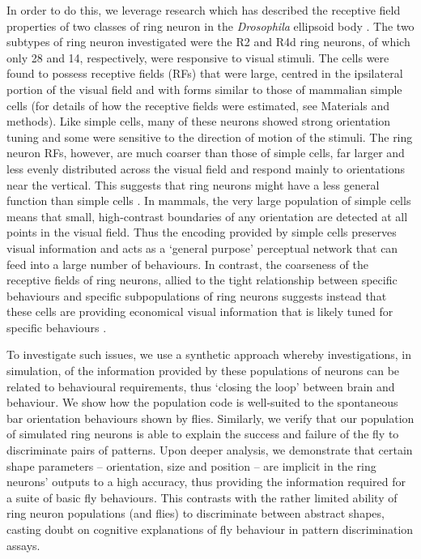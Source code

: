 In order to do this, we leverage research which has described the receptive field properties of two classes of ring neuron in the \emph{Drosophila} ellipsoid body \cite{Seelig2013}. The two subtypes of ring neuron investigated were the R2 and R4d ring neurons, of which only 28 and 14, respectively, were responsive to visual stimuli. The cells were found to possess receptive fields (\acp{RF}) that were large, centred in the ipsilateral portion of the visual field and with forms similar to those of mammalian simple cells \cite{Hubel1962} (for details of how the receptive fields were estimated, see Materials and methods). Like simple cells, many of these neurons showed strong orientation tuning and some were sensitive to the direction of motion of the stimuli. The ring neuron \acp{RF}, however, are much coarser than those of simple cells, far larger and less evenly distributed across the visual field and respond mainly to orientations near the vertical. This suggests that ring neurons might have a less general function than simple cells \cite{Wystrach2014}. In mammals, the very large population of simple cells means that small, high-contrast boundaries of any orientation are detected at all points in the visual field. Thus the encoding provided by simple cells preserves visual information and acts as a `general purpose' perceptual network that can feed into a large number of behaviours. In contrast, the coarseness of the receptive fields of ring neurons, allied to the tight relationship between specific behaviours and specific subpopulations of ring neurons suggests instead that these cells are providing economical visual information that is likely tuned for specific behaviours \cite{Wystrach2014}.

To investigate such issues, we use a synthetic approach whereby investigations, in simulation, of the information provided by these populations of neurons can be related to behavioural requirements, thus `closing the loop' between brain and behaviour. We show how the population code is well-suited to the spontaneous bar orientation behaviours shown by flies. Similarly, we verify that our population of simulated ring neurons is able to explain the success and failure of the fly to discriminate pairs of patterns. Upon deeper analysis, we demonstrate that certain shape parameters -- orientation, size and position -- are implicit in the ring neurons' outputs to a high accuracy, thus providing the information required for a suite of basic fly behaviours. This contrasts with the rather limited ability of ring neuron populations (and flies) to discriminate between abstract shapes, casting doubt on cognitive explanations of fly behaviour in pattern discrimination assays.

